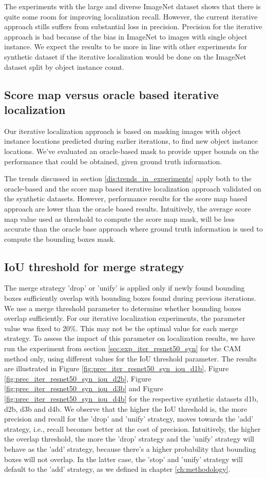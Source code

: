 The experiments with the large and diverse ImageNet dataset shows that there is quite some room for improving localization recall. However, the current iterative approach stills suffers from substantial loss in precision. Precision for the iterative approach is bad because of the bias in ImageNet to images with single object instance. We expect the results to be more in line with other experiments for synthetic dataset if the iterative localization would be done on the ImageNet dataset split by object instance count.

\subsection{Score map versus oracle based iterative localization}
Our iterative localization approach is based on masking images with object instance locations predicted during earlier iterations, to find new object instance locations. We've evaluated an oracle-based mask to provide upper bounds on the performance that could be obtained, given ground truth information. 

The trends discussed in section \ref{dis:trends_in_experiments} apply both to the oracle-based and the score map based iterative localization approach validated on the synthetic datasets. However, performance results for the score map based approach are lower than the oracle based results. Intuitively, the average score map value used as threshold to compute the score map mask, will be less accurate than the oracle base  approach where ground truth information is used to compute the bounding boxes mask. 

\subsection{IoU threshold for merge strategy}
The merge strategy 'drop' or 'unify' is applied only if newly found bounding boxes sufficiently overlap with bounding boxes found during previous iterations. We use a merge threshold parameter to determine whether bounding boxes overlap sufficiently. For our iterative localization experiments, the parameter value was fixed to 20\%. This may not be the optimal value for each merge strategy. To assess the impact of this parameter on localization results, we have run the experiment from section \ref{sec:exp_iter_resnet50_syn} for the CAM method only, using different values for the IoU threshold parameter. The results are illustrated in Figure \ref{fig:prec_iter_resnet50_syn_iou_d1b}, Figure \ref{fig:prec_iter_resnet50_syn_iou_d2b}, Figure \ref{fig:prec_iter_resnet50_syn_iou_d3b} and Figure \ref{fig:prec_iter_resnet50_syn_iou_d4b} for the respective synthetic datasets d1b, d2b, d3b and d4b. We observe that the higher the IoU threshold is, the more precision and recall for the 'drop' and 'unify' strategy, moves towards the 'add' strategy, i.e., recall becomes better at the cost of precision. Intuitively, the higher the overlap threshold, the more the 'drop' strategy and the 'unify' strategy will behave as the 'add' strategy, because there's a higher probability that bounding boxes will not overlap. In the latter case, the 'stop' and 'unify' strategy will default to the 'add' strategy, as we defined in chapter \ref{ch:methodology}.

